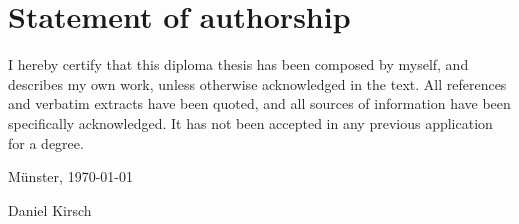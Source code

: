 \chapter{Statement of authorship}

\setlength{\parindent}{0mm}
I hereby certify that this diploma thesis has been composed by myself, and describes my own work, unless otherwise acknowledged in the text. All references and verbatim extracts have been quoted, and all sources of information have been specifically acknowledged. It has not been accepted in any previous application for a degree.\\

\vspace{20mm}

Münster, \today\\

\vspace{15mm}

Daniel Kirsch\\